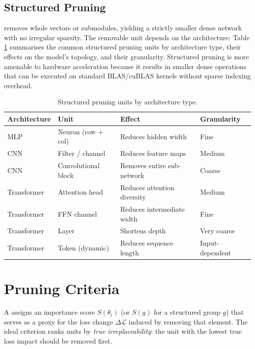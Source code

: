 \subsection{Structured Pruning}

 removes whole vectors or submodules, yielding a
strictly smaller dense network with no irregular sparsity.  The removable unit
depends on the architecture:
Table \ref{tab:structured_units} summarises the common structured pruning units by architecture type, their effects on the model's topology, and their granularity.  Structured pruning is more amenable to hardware acceleration because it results in smaller dense operations that can be executed on standard BLAS/cuBLAS kernels without sparse indexing overhead.
\begin{table}[H]
	\centering
	\caption{Structured pruning units by architecture type.}
	\label{tab:structured_units}
	\renewcommand{\arraystretch}{1.4}
	\begin{tabularx}{\textwidth}{llXl}
		\toprule
		\textbf{Architecture} & \textbf{Unit} & \textbf{Effect} & \textbf{Granularity} \\
		\midrule
		MLP & Neuron (row + col) & Reduces hidden width & Fine \\
		CNN & Filter / channel & Reduces feature maps & Medium \\
		CNN & Convolutional block & Removes entire sub-network & Coarse \\
		Transformer & Attention head & Reduces attention diversity & Medium \\
		Transformer & FFN channel & Reduces intermediate width & Fine \\
		Transformer & Layer & Shortens depth & Very coarse \\
		Transformer & Token (dynamic) & Reduces sequence length & Input-dependent \\
		\bottomrule
	\end{tabularx}
\end{table}

\section{Pruning Criteria}
\label{sec:pruning_criteria}

A  assigns an importance score $S(\theta_i)$ (or
$S(g)$ for a structured group $g$) that serves as a proxy for the loss change
$\Delta\mathcal{L}$ induced by removing that element.  The ideal criterion
ranks units by \emph{true irreplaceability}: the unit with the lowest true
loss impact should be removed first.

